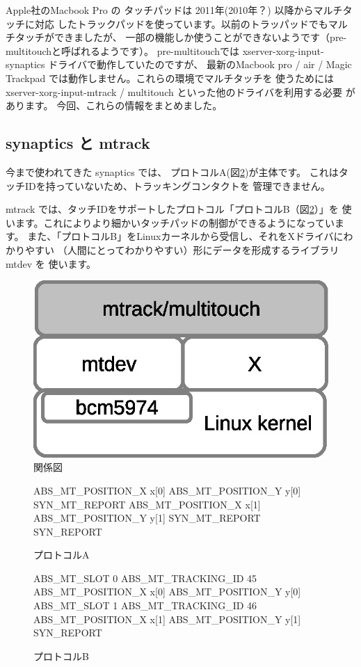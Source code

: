 \documentclass[mingoth,a4paper]{jsarticle}
\begin{document}
Apple社のMacbook Pro の タッチパッドは 2011年(2010年？) 以降からマルチタッチに対応
したトラックパッドを使っています。以前のトラッパッドでもマルチタッチができましたが、
一部の機能しか使うことができないようです（pre-multitouchと呼ばれるようです）。
pre-multitouchでは xserver-xorg-input-synaptics ドライバで動作していたのですが、
最新のMacbook pro / air / Magic Trackpad では動作しません。これらの環境でマルチタッチを
使うためには xserver-xorg-input-mtrack / multitouch といった他のドライバを利用する必要
があります。
今回、これらの情報をまとめました。

\subsection{synaptics と mtrack}
今まで使われてきた synaptics では、
プロトコルA(図\ref{fig:protocolA})が主体です。
これはタッチIDを持っていないため、トラッキングコンタクトを
管理できません。

mtrack では、タッチIDをサポートしたプロトコル「プロトコルB（図\ref{fig:protocolA}）」を
使います。これによりより細かいタッチパッドの制御ができるようになっています。
また、「プロトコルB」をLinuxカーネルから受信し、それをXドライバにわかりやすい
（人間にとってわかりやすい）形にデータを形成するライブラリ mtdev を
使います。

\begin{figure}[h]
\begin{center}
\includegraphics[width=0.3\hsize]{image201210/mtrack.eps}
\end{center}
\caption{関係図}
\label{fig:mtrack-relation}
\end{figure}

\begin{figure}[h]
\begin{commandline}
ABS_MT_POSITION_X x[0]
ABS_MT_POSITION_Y y[0]
SYN_MT_REPORT
ABS_MT_POSITION_X x[1]
ABS_MT_POSITION_Y y[1]
SYN_MT_REPORT
SYN_REPORT
\end{commandline}

\caption{プロトコルA}
\label{fig:protocolA}
\end{figure}

\begin{figure}[h]
\begin{commandline}
ABS_MT_SLOT 0
ABS_MT_TRACKING_ID 45
ABS_MT_POSITION_X x[0]
ABS_MT_POSITION_Y y[0]
ABS_MT_SLOT 1
ABS_MT_TRACKING_ID 46
ABS_MT_POSITION_X x[1]
ABS_MT_POSITION_Y y[1]
SYN_REPORT
\end{commandline}
\caption{プロトコルB}
\label{fig:protocolB}
\end{figure}
\end{document}
